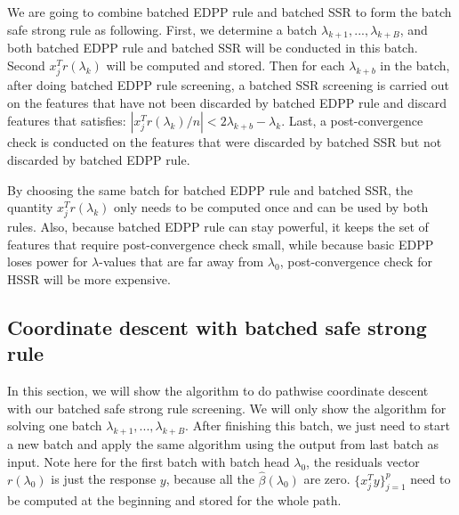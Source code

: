 \documentclass{article}
\begin{document}
We are going to combine batched EDPP rule and batched SSR to form the batch safe strong rule as following. First, we determine a batch $\lambda_{k+1},...,\lambda_{k+B}$, and both batched EDPP rule and batched SSR will be conducted in this batch. Second $x_j^Tr(\lambda_k)$ will be computed and stored. Then for each $\lambda_{k+b}$ in the batch, after doing batched EDPP rule screening, a batched SSR screening is carried out on the features that have not been discarded by batched EDPP rule and discard features that satisfies: $|x_j^Tr(\lambda_k)/n|<2\lambda_{k+b}-\lambda_k$. Last, a post-convergence check is conducted on the features that were discarded by batched SSR but not discarded by batched EDPP rule.

By choosing the same batch for batched EDPP rule and batched SSR, the quantity $x_j^Tr(\lambda_k)$ only needs to be computed once and can be used by both rules. Also, because batched EDPP rule can stay powerful, it keeps the set of features that require post-convergence check small, while because basic EDPP loses power for $\lambda$-values that are far away from $\lambda_0$, post-convergence check for HSSR will be more expensive.

\subsection{Coordinate descent with batched safe strong rule}

In this section, we will show the algorithm to do pathwise coordinate descent with our batched safe strong rule screening. We will only show the algorithm for solving one batch $\lambda_{k+1},...,\lambda_{k+B}$. After finishing this batch, we just need to start a new batch and apply the same algorithm using the output from last batch as input. Note here for the first batch with batch head $\lambda_0$, the residuals vector $r(\lambda_0)$ is just the response $y$, because all the $\hat{\beta}(\lambda_0)$ are zero. $\{x_j^Ty\}_{j=1}^p$ need to be computed at the beginning and stored for the whole path.
\end{document}
